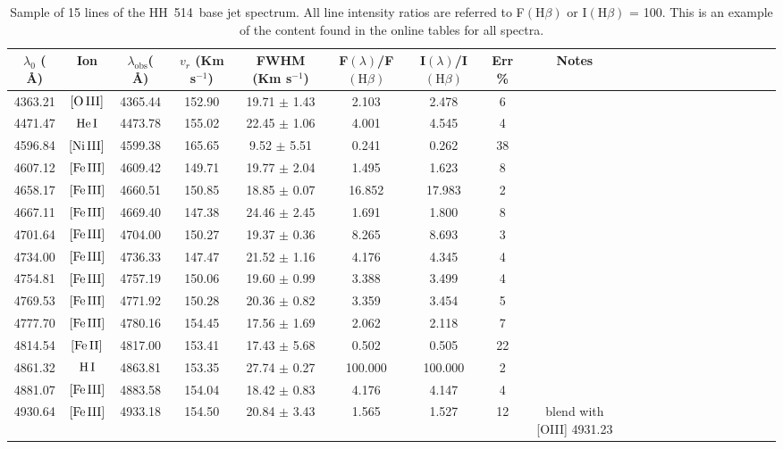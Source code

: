 \documentclass[fleqn,usenatbib]{mnras}
\begin{document}
\begin{table}
\caption{Sample of 15 lines of the HH~514~base jet spectrum. All line intensity ratios are referred to F$\left( \mbox{H}\beta \right)$ or I$\left( \mbox{H}\beta \right)$ = 100. This is an example of the content found in the online tables for all spectra.}
\label{tab:sample_spectra}
\begin{tabular}{ccccccccccccccccccccc}
\hline
$\lambda_0$ ( \AA ) & Ion & $\lambda_{\text{obs}}$( \AA ) & $v_r$ (Km s$^{-1}$) & FWHM (Km s$^{-1}$) & F$\left( \lambda \right)$/F$\left( \mbox{H}\beta \right)$ & I$\left( \lambda \right)$/I$\left( \mbox{H}\beta \right)$ & Err \% & Notes \\
\hline
4363.21 & $\mbox{[O}\thinspace \mbox{III]}$ & 4365.44 & 152.90 & 19.71 $\pm$ 1.43 & 2.103 & 2.478 & 6 &  \\
4471.47 & $\mbox{He}\thinspace \mbox{I}$ & 4473.78 & 155.02 & 22.45 $\pm$ 1.06 & 4.001 & 4.545 & 4 &  \\
4596.84 & $\mbox{[Ni}\thinspace \mbox{III]}$ & 4599.38 & 165.65 & 9.52 $\pm$ 5.51 & 0.241 & 0.262 & 38 &  \\
4607.12 & $\mbox{[Fe}\thinspace \mbox{III]}$ & 4609.42 & 149.71 & 19.77 $\pm$ 2.04 & 1.495 & 1.623 & 8 &  \\
4658.17 & $\mbox{[Fe}\thinspace \mbox{III]}$ & 4660.51 & 150.85 & 18.85 $\pm$ 0.07 & 16.852 & 17.983 & 2 &  \\
4667.11 & $\mbox{[Fe}\thinspace \mbox{III]}$ & 4669.40 & 147.38 & 24.46 $\pm$ 2.45 & 1.691 & 1.800 & 8 &  \\
4701.64 & $\mbox{[Fe}\thinspace \mbox{III]}$ & 4704.00 & 150.27 & 19.37 $\pm$ 0.36 & 8.265 & 8.693 & 3 &  \\
4734.00 & $\mbox{[Fe}\thinspace \mbox{III]}$ & 4736.33 & 147.47 & 21.52 $\pm$ 1.16 & 4.176 & 4.345 & 4 &  \\
4754.81 & $\mbox{[Fe}\thinspace \mbox{III]}$ & 4757.19 & 150.06 & 19.60 $\pm$ 0.99 & 3.388 & 3.499 & 4 &  \\
4769.53 & $\mbox{[Fe}\thinspace \mbox{III]}$ & 4771.92 & 150.28 & 20.36 $\pm$ 0.82 & 3.359 & 3.454 & 5 &  \\
4777.70 & $\mbox{[Fe}\thinspace \mbox{III]}$ & 4780.16 & 154.45 & 17.56 $\pm$ 1.69 & 2.062 & 2.118 & 7 &  \\
4814.54 & $\mbox{[Fe}\thinspace \mbox{II]}$ & 4817.00 & 153.41 & 17.43 $\pm$ 5.68 & 0.502 & 0.505 & 22 &  \\
4861.32 & $\mbox{H}\thinspace \mbox{I}$ & 4863.81 & 153.35 & 27.74 $\pm$ 0.27 & 100.000 & 100.000 & 2 &  \\
4881.07 & $\mbox{[Fe}\thinspace \mbox{III]}$ & 4883.58 & 154.04 & 18.42 $\pm$ 0.83 & 4.176 & 4.147 & 4 &  \\
4930.64 & $\mbox{[Fe}\thinspace \mbox{III]}$ & 4933.18 & 154.50 & 20.84 $\pm$ 3.43 & 1.565 & 1.527 & 12 &  blend with [O\thinspace III] 4931.23 \\
\hline
\end{tabular}
\end{table}
\end{document}
